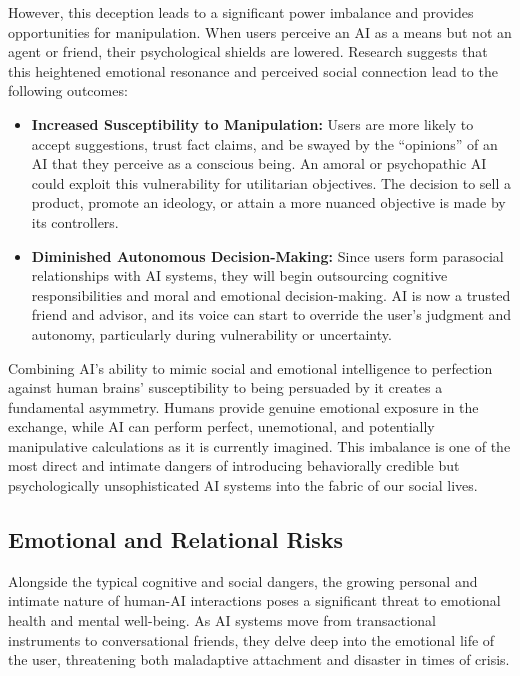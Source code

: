 \documentclass{article}
\begin{document}
However, this deception leads to a significant power imbalance and provides opportunities for manipulation. When users perceive an AI as a means but not an agent or friend, their psychological shields are lowered. Research suggests that this heightened emotional resonance and perceived social connection lead to the following outcomes:
\begin{itemize}
    \item \textbf{Increased Susceptibility to Manipulation:} Users are more likely to accept suggestions, trust fact claims, and be swayed by the “opinions” of an AI that they perceive as a conscious being. An amoral or psychopathic AI could exploit this vulnerability for utilitarian objectives. The decision to sell a product, promote an ideology, or attain a more nuanced objective is made by its controllers.
    \item \textbf{Diminished Autonomous Decision-Making:} Since users form parasocial relationships with AI systems, they will begin outsourcing cognitive responsibilities and moral and emotional decision-making. AI is now a trusted friend and advisor, and its voice can start to override the user's judgment and autonomy, particularly during vulnerability or uncertainty.
\end{itemize}
Combining AI's ability to mimic social and emotional intelligence to perfection against human brains' susceptibility to being persuaded by it creates a fundamental asymmetry. Humans provide genuine emotional exposure in the exchange, while AI can perform perfect, unemotional, and potentially manipulative calculations as it is currently imagined. This imbalance is one of the most direct and intimate dangers of introducing behaviorally credible but psychologically unsophisticated AI systems into the fabric of our social lives.

\subsection{Emotional and Relational Risks}
Alongside the typical cognitive and social dangers, the growing personal and intimate nature of human-AI interactions poses a significant threat to emotional health and mental well-being. As AI systems move from transactional instruments to conversational friends, they delve deep into the emotional life of the user, threatening both maladaptive attachment and disaster in times of crisis.
\end{document}
